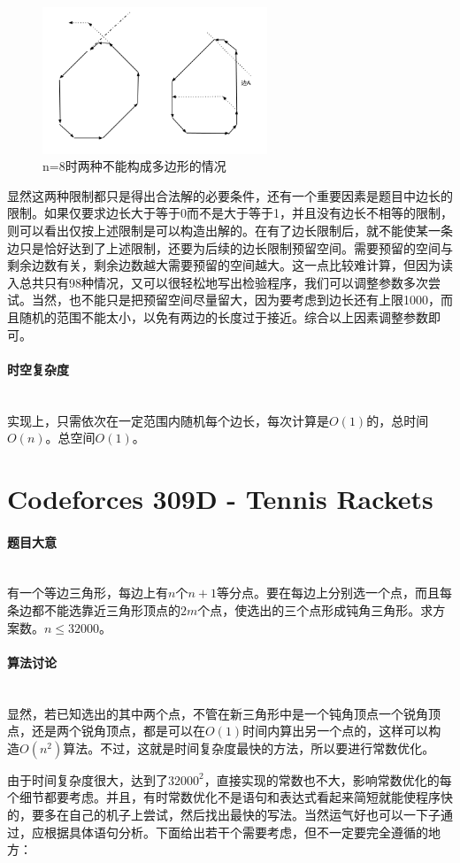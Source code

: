 \documentclass[UTF8]{ctexart}
\newcommand{\myparagraph}[1]{\paragraph{#1}\mbox{}\\}
\theoremstyle{nonumberplain}
\begin{document}
			\begin{figure}[ht]
				\centering
				\includegraphics[width=0.6\textwidth]{fig306d_2.png}
				\caption{n=8时两种不能构成多边形的情况}
			\end{figure}
			
			显然这两种限制都只是得出合法解的必要条件，还有一个重要因素是题目中边长的限制。如果仅要求边长大于等于0而不是大于等于1，并且没有边长不相等的限制，则可以看出仅按上述限制是可以构造出解的。在有了边长限制后，就不能使某一条边只是恰好达到了上述限制，还要为后续的边长限制预留空间。需要预留的空间与剩余边数有关，剩余边数越大需要预留的空间越大。这一点比较难计算，但因为读入总共只有98种情况，又可以很轻松地写出检验程序，我们可以调整参数多次尝试。当然，也不能只是把预留空间尽量留大，因为要考虑到边长还有上限1000，而且随机的范围不能太小，以免有两边的长度过于接近。综合以上因素调整参数即可。
		
		\myparagraph{时空复杂度}
		
			实现上，只需依次在一定范围内随机每个边长，每次计算是$O(1)$的，总时间$O(n)$。总空间$O(1)$。
	
	\section{Codeforces 309D - Tennis Rackets}
	
		\myparagraph{题目大意}
		
			有一个等边三角形，每边上有$n$个$n+1$等分点。要在每边上分别选一个点，而且每条边都不能选靠近三角形顶点的$2m$个点，使选出的三个点形成钝角三角形。求方案数。$n \leq 32000$。
		
		\myparagraph{算法讨论}
		
			显然，若已知选出的其中两个点，不管在新三角形中是一个钝角顶点一个锐角顶点，还是两个锐角顶点，都是可以在$O(1)$时间内算出另一个点的，这样可以构造$O(n^2)$算法。不过，这就是时间复杂度最快的方法，所以要进行常数优化。
			
			由于时间复杂度很大，达到了$32000^2$，直接实现的常数也不大，影响常数优化的每个细节都要考虑。并且，有时常数优化不是语句和表达式看起来简短就能使程序快的，要多在自己的机子上尝试，然后找出最快的写法。当然运气好也可以一下子通过，应根据具体语句分析。下面给出若干个需要考虑，但不一定要完全遵循的地方：
			
\end{document}

